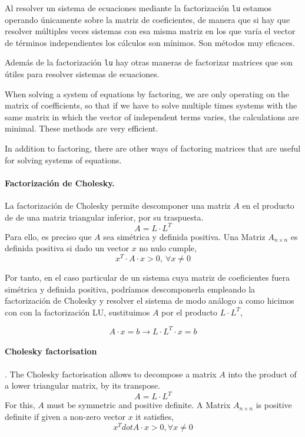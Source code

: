 \begin{paracol}{2}
    Al resolver un sistema de ecuaciones mediante la factorización \texttt{lu} estamos operando únicamente sobre la matriz de coeficientes, de manera que si hay que resolver múltiples veces sistemas con esa misma matriz en los que varía el vector de términos independientes los cálculos son mínimos. Son métodos muy eficaces.

    Además de la factorización \texttt{lu} hay otras maneras de factorizar matrices que son útiles para resolver sistemas de ecuaciones. 

    \switchcolumn
    When solving a system of equations by factoring, we are only operating on the matrix of coefficients, so that if we have to solve multiple times systems with the same matrix in which the vector of independent terms varies, the calculations are minimal. These methods are very efficient.

    In addition to factoring, there are other ways of factoring matrices that are useful for solving systems of equations. 

    \switchcolumn

    \paragraph{Factorización de Cholesky.} La factorización de Cholesky permite descomponer una matriz $A$ en el producto de de una matriz triangular inferior, por su traspuesta. 
\begin{equation*}
A=L\cdot L^T
\end{equation*}
Para ello, es preciso que $A$ sea simétrica y definida positiva. Una Matriz $A_{n \times n}$ es definida positiva si dado un vector $x$ no nulo cumple,
\begin{equation*}
x^T\cdot A \cdot x > 0, \ \forall x\neq 0
\end{equation*}

Por tanto, en el caso particular de un sistema cuya matriz de coeficientes fuera simétrica y definida positiva, podríamos descomponerla empleando la factorización de Cholesky y resolver el sistema de modo análogo a como hicimos con con la factorización LU, sustituimos $A$ por el producto $L\cdot L^T$,

\begin{equation*}
A\cdot x = b \rightarrow L\cdot L^T\cdot x= b
\end{equation*}


\switchcolumn
\paragraph{Cholesky factorisation}. The Cholesky factorisation allows to decompose a matrix $A$ into the product of a lower triangular matrix, by its transpose. 
\begin{equation*}
A=L \cdot L^T
\end{equation*}
For this, $A$ must be symmetric and positive definite. A Matrix $A_{n \times n}$ is positive definite if given a non-zero vector $x$ it satisfies,
\begin{equation*}
x^Tdot A \cdot x > 0, \forall x \neq 0
\end{equation*}


\end{paracol}
